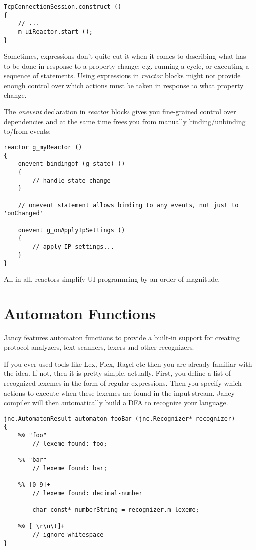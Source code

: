 \documentclass[oneside]{book}
\begin{document}
\begin{lstlisting}
TcpConnectionSession.construct ()
{
    // ...
    m_uiReactor.start ();
}
\end{lstlisting}

Sometimes, expressions don't quite cut it when it comes to describing what has to be done in response to a property change: e.g. running a cycle, or executing a sequence of statements. Using expressions in \emph{reactor} blocks might not provide enough control over which actions must be taken in response to what property change.

The \emph{onevent} declaration in \emph{reactor} blocks gives you fine-grained control over dependencies and at the same time frees you from manually binding/unbinding to/from events:

\begin{lstlisting}
reactor g_myReactor ()
{
    onevent bindingof (g_state) ()
    {
        // handle state change
    }

    // onevent statement allows binding to any events, not just to 'onChanged' 

    onevent g_onApplyIpSettings ()
    {
        // apply IP settings...
    }
}
\end{lstlisting}

All in all, reactors simplify UI programming by an order of magnitude.

\section{Automaton Functions}

Jancy features automaton functions to provide a built-in support for creating protocol analyzers, text scanners, lexers and other recognizers.

If you ever used tools like Lex, Flex, Ragel etc then you are already familiar with the idea. If not, then it is pretty simple, actually. First, you define a list of recognized lexemes in the form of regular expressions. Then you specify which actions to execute when these lexemes are found in the input stream. Jancy compiler will then automatically build a DFA to recognize your language.

\begin{lstlisting}
jnc.AutomatonResult automaton fooBar (jnc.Recognizer* recognizer)
{
    %% "foo"
        // lexeme found: foo;

    %% "bar"
        // lexeme found: bar;

    %% [0-9]+
        // lexeme found: decimal-number
        
        char const* numberString = recognizer.m_lexeme;

    %% [ \r\n\t]+
        // ignore whitespace
}
\end{lstlisting}
\end{document}
